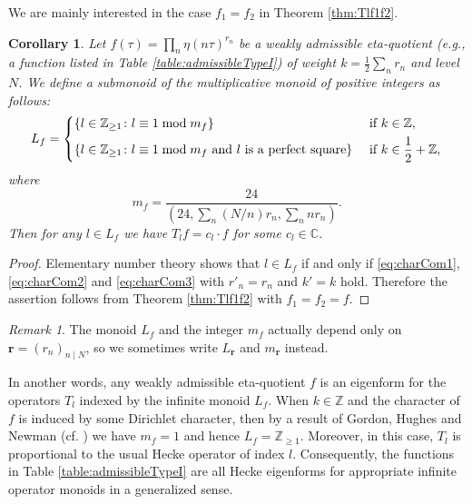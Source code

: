 \documentclass[12pt]{amsart}
\numberwithin{equation}{section}
\theoremstyle{plain}
\newtheorem{coro}[thm]{Corollary}
\theoremstyle{definition}
\theoremstyle{remark}
\newtheorem{rema}[thm]{Remark}
\newcommand\numZ{\mathbb{Z}}
\newcommand\numC{\mathbb{C}}
\newcommand\numgeq[2]{\mathbb{#1}_{\geq #2}}
\begin{document}
We are mainly interested in the case $f_1=f_2$ in Theorem \ref{thm:Tlf1f2}.
\begin{coro}
\label{coro:Lfmf}
Let $f(\tau)=\prod_{n}\eta(n\tau)^{r_n}$ be a weakly admissible eta-quotient (e.g., a function listed in Table \ref{table:admissibleTypeI}) of weight $k=\frac{1}{2}\sum_nr_n$ and level $N$. We define a submonoid of the multiplicative monoid of positive integers as follows:
\begin{equation*}
L_f=\begin{dcases}
\left\{l\in\numgeq{Z}{1}\colon l\equiv1\bmod{m_f}\right\} & \text{ if } k\in\numZ,\\
\left\{l\in\numgeq{Z}{1}\colon l\equiv1\bmod{m_f}\text{ and }l\text{ is a perfect square}\right\} & \text{ if } k\in\frac{1}{2}+\numZ,
\end{dcases}
\end{equation*}
where $$m_f=\frac{24}{(24,\sum_n(N/n)r_n,\sum_nnr_n)}.$$
Then for any $l\in L_f$ we have $T_lf=c_l\cdot f$ for some $c_l\in\numC$.
\end{coro}
\begin{proof}
Elementary number theory shows that $l\in L_f$ if and only if \eqref{eq:charCom1}, \eqref{eq:charCom2} and \eqref{eq:charCom3} with $r'_n=r_n$ and $k'=k$ hold. Therefore the assertion follows from Theorem \ref{thm:Tlf1f2} with $f_1=f_2=f$.
\end{proof}
\begin{rema}
\label{rema:mrLr}
The monoid $L_f$ and the integer $m_f$ actually depend only on $\mathbf{r}=(r_n)_{n\mid N}$, so we sometimes write $L_\mathbf{r}$ and $m_\mathbf{r}$ instead.
\end{rema}
In another words, any weakly admissible eta-quotient $f$ is an eigenform for the operators $T_l$ indexed by the infinite monoid $L_f$. When $k\in\numZ$ and the character of $f$ is induced by some Dirichlet character, then by a result of Gordon, Hughes and Newman (cf. \cite[Theorem 1.64]{Ono04}) we have $m_f=1$ and hence $L_f=\numgeq{Z}{1}$. Moreover, in this case, $T_l$ is proportional to the usual Hecke operator of index $l$. Consequently, the functions in Table \ref{table:admissibleTypeI} are all Hecke eigenforms for appropriate infinite operator monoids in a generalized sense.
\end{document}
